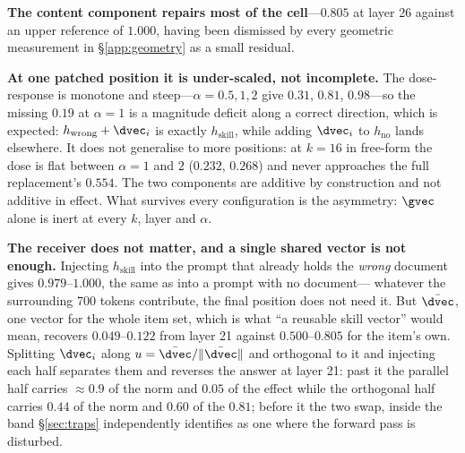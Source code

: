 \textbf{The content component repairs most of the cell}---$0.805$ at layer 26
against an upper reference of $1.000$, having been dismissed by every geometric
measurement in \S\ref{app:geometry} as a small residual.

\textbf{At one patched position it is under-scaled, not incomplete.} The
dose-response is monotone and steep---$\alpha=0.5,1,2$ give $0.31$, $0.81$,
$0.98$---so the missing $0.19$ at $\alpha=1$ is a magnitude deficit along a
correct direction, which is expected: $h_{\text{wrong}} + \dvec_i$ is exactly
$h_{\text{skill}}$, while adding $\dvec_i$ to $h_{\text{no}}$ lands elsewhere.
It does not generalise to more positions: at $k=16$ in free-form the dose is
flat between $\alpha=1$ and $2$ ($0.232$, $0.268$) and never approaches the full
replacement's $0.554$. The two components are additive by construction and not
additive in effect. What survives every configuration is the asymmetry: $\gvec$
alone is inert at every $k$, layer and $\alpha$.

\textbf{The receiver does not matter, and a single shared vector is not enough.}
Injecting $h_{\text{skill}}$ into the prompt that already holds the \emph{wrong}
document gives $0.979$--$1.000$, the same as into a prompt with no document---%
whatever the surrounding 700 tokens contribute, the final position does not need
it. But $\bar{\dvec}$, one vector for the whole item set, which is what ``a
reusable skill vector'' would mean, recovers $0.049$--$0.122$ from layer 21
against $0.500$--$0.805$ for the item's own. Splitting $\dvec_i$ along
$u=\bar{\dvec}/\|\bar{\dvec}\|$ and orthogonal to it and injecting each half
separates them and reverses the answer at layer 21: past it the parallel half
carries $\approx 0.9$ of the norm and $0.05$ of the effect while the orthogonal
half carries $0.44$ of the norm and $0.60$ of the $0.81$; before it the two swap,
inside the band \S\ref{sec:traps} independently identifies as one where the
forward pass is disturbed.

